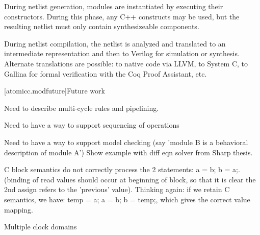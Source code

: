 During netlist
generation, modules are instantiated by executing their
constructors. During this phase, any C++ constructs may be used, but
the resulting netlist must only contain synthesizeable components.

During netlist compilation, the netlist is analyzed and translated to
an intermediate representation and then to Verilog for simulation or
synthesis. Alternate translations are possible: to native code via
LLVM, to System C, to Gallina for formal verification with the Coq
Proof Assistant, etc.

[atomicc.modfuture]{Future work}

Need to describe multi-cycle rules and pipelining.

Need to have a way to support sequencing of operations

Need to have a way to support model checking (say 'module B is a behavioral description of module A')
Show example with diff eqn solver from Sharp thesis.

C block semantics do not correctly process the 2 statements: a = b; b = a;.
(binding of read values should occur at beginning of block, so that it is clear the
2nd assign refers to the 'previous' value).
Thinking again: if we retain C semantics, we have: temp = a; a = b; b = temp;, which
gives the correct value mapping.

Multiple clock domains
